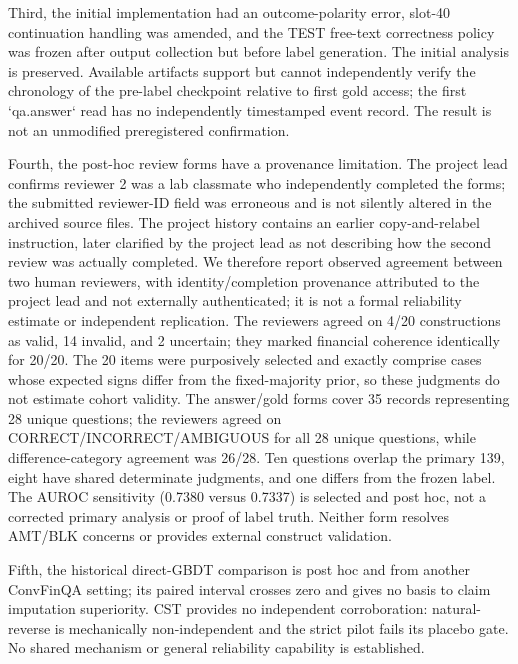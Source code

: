 \documentclass[11pt]{article}
\begin{document}
Third, the initial implementation had an outcome-polarity error, slot-40 continuation handling was amended, and the TEST free-text correctness policy was frozen after output collection but before label generation. The initial analysis is preserved. Available artifacts support but cannot independently verify the chronology of the pre-label checkpoint relative to first gold access; the first `qa.answer` read has no independently timestamped event record. The result is not an unmodified preregistered confirmation.

Fourth, the post-hoc review forms have a provenance limitation. The project lead confirms reviewer 2 was a lab classmate who independently completed the forms; the submitted reviewer-ID field was erroneous and is not silently altered in the archived source files. The project history contains an earlier copy-and-relabel instruction, later clarified by the project lead as not describing how the second review was actually completed. We therefore report observed agreement between two human reviewers, with identity/completion provenance attributed to the project lead and not externally authenticated; it is not a formal reliability estimate or independent replication. The reviewers agreed on 4/20 constructions as valid, 14 invalid, and 2 uncertain; they marked financial coherence identically for 20/20. The 20 items were purposively selected and exactly comprise cases whose expected signs differ from the fixed-majority prior, so these judgments do not estimate cohort validity. The answer/gold forms cover 35 records representing 28 unique questions; the reviewers agreed on CORRECT/INCORRECT/AMBIGUOUS for all 28 unique questions, while difference-category agreement was 26/28. Ten questions overlap the primary 139, eight have shared determinate judgments, and one differs from the frozen label. The AUROC sensitivity (0.7380 versus 0.7337) is selected and post hoc, not a corrected primary analysis or proof of label truth. Neither form resolves AMT/BLK concerns or provides external construct validation.

Fifth, the historical direct-GBDT comparison is post hoc and from another ConvFinQA setting; its paired interval crosses zero and gives no basis to claim imputation superiority. CST provides no independent corroboration: natural-reverse is mechanically non-independent and the strict pilot fails its placebo gate. No shared mechanism or general reliability capability is established.
\end{document}
